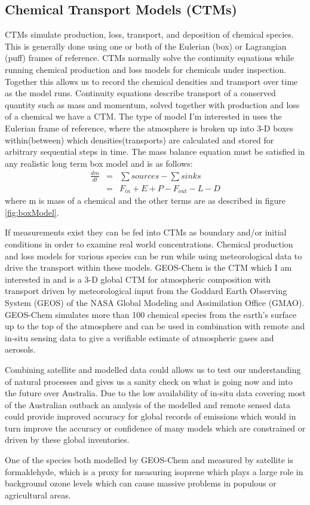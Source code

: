 \subsection{Chemical Transport Models (CTMs)}
CTMs simulate production, loss, transport, and deposition of chemical species.
This is generally done using one or both of the Eulerian (box) or Lagrangian (puff) frames of reference.
CTMs normally solve the continuity equations while running chemical production and loss models for chemicals under inspection. Together this allows us to record the chemical densities and transport over time as the model runs.
Continuity equations describe transport of a conserved quantity such as mass and momentum, solved together with production and loss of a chemical we have a CTM.
The type of model I'm interested in uses the Eulerian frame of reference, where the atmosphere is broken up into 3-D boxes within(between) which densities(transports) are calculated and stored for arbitrary sequential steps in time.
The mass balance equation must be satisfied in any realistic long term box model and is as follows: 
\begin{eqnarray*}
\frac{dm}{dt} &=& \sum{sources}-\sum{sinks} \\
    &=& F_{in} + E + P - F_{out} - L - D \end{eqnarray*}
where m is mass of a chemical and the other terms are as described in figure \ref{fig:boxModel}.

If measurements exist they can be fed into CTMs as boundary and/or initial conditions in order to examine real world concentrations.
Chemical production and loss models for various species can be run while using meteorological data to drive the transport within these models.
GEOS-Chem is the CTM which I am interested in and is a 3-D global CTM for atmospheric composition with transport driven by meteorological input from the Goddard Earth Observing System (GEOS) of the NASA Global Modeling and Assimilation Office (GMAO).
GEOS-Chem simulates more than 100 chemical species from the earth's surface up to the top of the atmosphere and can be used in combination with remote and in-situ sensing data to give a verifiable estimate of atmospheric gases and aerosols.

Combining satellite and modelled data could allows us to test our understanding of natural processes and gives us a sanity check on what is going now and into the future over Australia.
Due to the low availability of in-situ data covering most of the Australian outback an analysis of the modelled and remote sensed data could provide improved accuracy for global records of emissions which would in turn improve the accuracy or confidence of many models which are constrained or driven by these global inventories.

One of the species both modelled by GEOS-Chem and measured by satellite is formaldehyde, which is a proxy for measuring isoprene which plays a large role in background ozone levels which can cause massive problems in populous or agricultural areas.